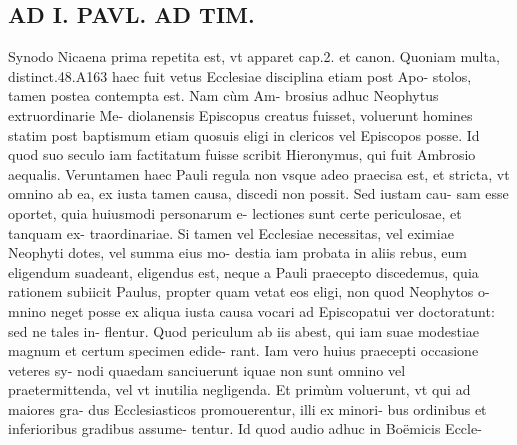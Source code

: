 \documentclass{article}
\begin{document}
\begin{pages}
\section*{AD I. PAVL. AD TIM. }
\marginpar{[ p.146 ]}\pstart Synodo Nicaena prima repetita est, vt apparet cap.2. et canon. Quoniam multa, distinct.48.A163 haec fuit vetus Ecclesiae disciplina etiam post Apo- stolos, tamen postea contempta est. Nam cùm Am- brosius adhuc Neophytus extruordinarie Me- diolanensis Episcopus creatus fuisset, voluerunt homines statim post baptismum etiam quosuis eligi in clericos vel Episcopos posse. Id quod suo seculo iam factitatum fuisse scribit Hieronymus, qui fuit Ambrosio aequalis.  \pend\pstart Veruntamen haec Pauli regula non vsque adeo praecisa est, et stricta, vt omnino ab ea, ex iusta tamen causa, discedi non possit. Sed iustam cau- sam esse oportet, quia huiusmodi personarum e- lectiones sunt certe periculosae, et tanquam ex- traordinariae. Si tamen vel Ecclesiae necessitas, vel eximiae Neophyti dotes, vel summa eius mo- destia iam probata in aliis rebus, eum eligendum suadeant, eligendus est, neque a Pauli praecepto discedemus, quia rationem subiicit Paulus, propter quam vetat eos eligi, non quod Neophytos o- mnino neget posse ex aliqua iusta causa vocari ad Episcopatui ver doctoratunt: sed ne tales in- flentur. Quod periculum ab iis abest, qui iam suae modestiae magnum et certum specimen edide- rant.  \pend\pstart Iam vero huius praecepti occasione veteres sy- nodi quaedam sanciuerunt iquae non sunt omnino vel praetermittenda, vel vt inutilia negligenda.  \pend\pstart Et primùm voluerunt, vt qui ad maiores gra- dus Ecclesiasticos promouerentur, illi ex minori- bus ordinibus et inferioribus gradibus assume- tentur. Id quod audio adhuc in Boëmicis Eccle-  \pend

\end{pages}
\end{document}
